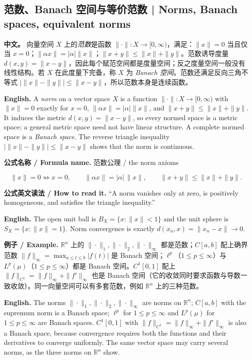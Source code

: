 \documentclass[UTF8,11pt,a4paper]{ctexart}
\newcommand{\EN}[1]{\par\noindent \textbf{English.} #1\par}
\newcommand{\READ}[1]{\par\noindent \textbf{公式英文读法 / How to read it.} #1\par}
\newcommand{\FORMULA}[2]{\par\noindent\textbf{公式名称 / Formula name.} #1 / #2\par}
\newcommand{\EX}[2]{\par\noindent \textbf{例子 / Example.} #1\par\EN{#2}}
\newcommand{\APS}[2]{\par\noindent\textbf{中文。} #1\par\noindent\textbf{English.} #2\par\smallskip}
\begin{document}
\subsection{范数、Banach 空间与等价范数 | Norms, Banach spaces, equivalent norms}
\APS{向量空间 $X$ 上的\emph{范数}是函数 $\|\cdot\|:X\to[0,\infty)$，满足：$\|x\|=0$ 当且仅当 $x=0$；$\|\alpha x\|=|\alpha|\|x\|$；$\|x+y\|\le\|x\|+\|y\|$。范数诱导度量 $d(x,y)=\|x-y\|$，因此每个赋范空间都是度量空间；反之度量空间一般没有线性结构。若 $X$ 在此度量下完备，称 $X$ 为 \emph{Banach 空间}。范数还满足反向三角不等式 $|\|x\|-\|y\||\le\|x-y\|$，所以范数本身是连续函数。}{A \emph{norm} on a vector space $X$ is a function $\|\cdot\|:X\to[0,\infty)$ with $\|x\|=0$ exactly for $x=0$, $\|\alpha x\|=|\alpha|\|x\|$, and $\|x+y\|\le\|x\|+\|y\|$. It induces the metric $d(x,y)=\|x-y\|$, so every normed space is a metric space; a general metric space need not have linear structure. A complete normed space is a \emph{Banach space}. The reverse triangle inequality $|\|x\|-\|y\||\le\|x-y\|$ shows that the norm is continuous.}
\FORMULA{范数公理}{the norm axioms}
\[
\|x\|=0\Longleftrightarrow x=0,\qquad
\|\alpha x\|=|\alpha|\,\|x\|,\qquad
\|x+y\|\le\|x\|+\|y\|.
\]
\READ{``A norm vanishes only at zero, is positively homogeneous, and satisfies the triangle inequality.''}
\EN{The open unit ball is $B_X=\{x:\|x\|<1\}$ and the unit sphere is $S_X=\{x:\|x\|=1\}$. Norm convergence is exactly $d(x_n,x)=\|x_n-x\|\to0$.}

\EX{$\mathbb R^n$ 上的 $\|\cdot\|_1,\|\cdot\|_2,\|\cdot\|_\infty$ 都是范数；$C[a,b]$ 配上确界范数 $\|f\|_\infty=\max_{a\le t\le b}|f(t)|$ 是 Banach 空间；$\ell^p$（$1\le p\le\infty$）与 $L^p(\mu)$（$1\le p\le\infty$）都是 Banach 空间。$C^1[0,1]$ 配上 $\|f\|_{C^1}=\|f\|_\infty+\|f'\|_\infty$ 也是 Banach 空间（它的收敛同时要求函数与导数一致收敛）。同一向量空间可以有多套范数，例如 $\mathbb R^n$ 上的三种范数。}{The norms $\|\cdot\|_1,\|\cdot\|_2,\|\cdot\|_\infty$ are norms on $\mathbb R^n$; $C[a,b]$ with the supremum norm is a Banach space; $\ell^p$ for $1\le p\le\infty$ and $L^p(\mu)$ for $1\le p\le\infty$ are Banach spaces. $C^1[0,1]$ with $\|f\|_{C^1}=\|f\|_\infty+\|f'\|_\infty$ is also a Banach space, because convergence requires both the functions and their derivatives to converge uniformly. The same vector space may carry several norms, as the three norms on $\mathbb R^n$ show.}
\end{document}
